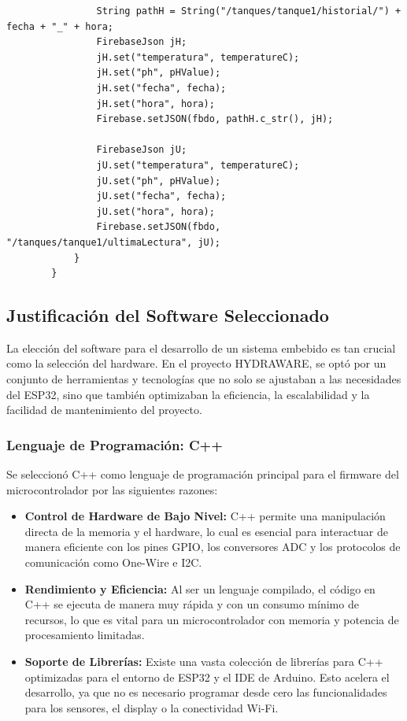 \documentclass[a4paper,12pt]{article}
\begin{document}
\begin{verbatim}
				String pathH = String("/tanques/tanque1/historial/") + fecha + "_" + hora;
				FirebaseJson jH;
				jH.set("temperatura", temperatureC);
				jH.set("ph", pHValue);
				jH.set("fecha", fecha);
				jH.set("hora", hora);
				Firebase.setJSON(fbdo, pathH.c_str(), jH);
				
				FirebaseJson jU;
				jU.set("temperatura", temperatureC);
				jU.set("ph", pHValue);
				jU.set("fecha", fecha);
				jU.set("hora", hora);
				Firebase.setJSON(fbdo, "/tanques/tanque1/ultimaLectura", jU);
			}
		}
	\end{verbatim}
	
	
	\subsection{Justificación del Software Seleccionado}
	La elección del software para el desarrollo de un sistema embebido es tan crucial como la selección del hardware. En el proyecto HYDRAWARE, se optó por un conjunto de herramientas y tecnologías que no solo se ajustaban a las necesidades del ESP32, sino que también optimizaban la eficiencia, la escalabilidad y la facilidad de mantenimiento del proyecto.
	
	\subsubsection{Lenguaje de Programación: C++}
	Se seleccionó C++ como lenguaje de programación principal para el firmware del microcontrolador por las siguientes razones:
	\begin{itemize}
		\item \textbf{Control de Hardware de Bajo Nivel:} C++ permite una manipulación directa de la memoria y el hardware, lo cual es esencial para interactuar de manera eficiente con los pines GPIO, los conversores ADC y los protocolos de comunicación como One-Wire e I2C.
		\item \textbf{Rendimiento y Eficiencia:} Al ser un lenguaje compilado, el código en C++ se ejecuta de manera muy rápida y con un consumo mínimo de recursos, lo que es vital para un microcontrolador con memoria y potencia de procesamiento limitadas.
		\item \textbf{Soporte de Librerías:} Existe una vasta colección de librerías para C++ optimizadas para el entorno de ESP32 y el IDE de Arduino. Esto acelera el desarrollo, ya que no es necesario programar desde cero las funcionalidades para los sensores, el display o la conectividad Wi-Fi.
	\end{itemize}
	
\end{document}
